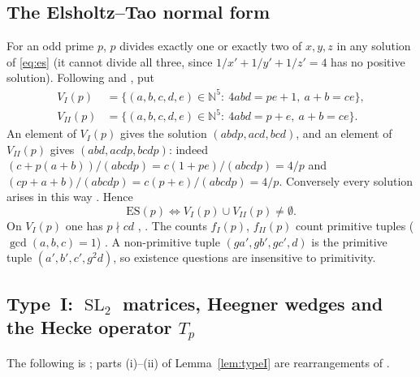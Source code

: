 \documentclass[10pt,reqno]{amsart}
\theoremstyle{definition}
\numberwithin{equation}{section}
\newcommand{\N}{\mathbb N}
\DeclareMathOperator{\SL}{SL}
\begin{document}
\subsection{The Elsholtz--Tao normal form}
For an odd prime $p$, $p$ divides exactly one or exactly two of $x,y,z$ in
any solution of \eqref{eq:es} (it cannot divide all three, since
$1/x'+1/y'+1/z'=4$ has no positive solution). Following \cite[\S2]{ET}
and \cite[\S2.0]{RT2}, put
\begin{align*}
V_I(p)&=\{(a,b,c,d,e)\in\N^5:\ 4abd=pe+1,\ a+b=ce\},\\
V_{II}(p)&=\{(a,b,c,d,e)\in\N^5:\ 4abd=p+e,\ a+b=ce\}.
\end{align*}
An element of $V_I(p)$ gives the solution $(abdp,acd,bcd)$, and an element
of $V_{II}(p)$ gives $(abd,acdp,bcdp)$: indeed
$(c+p(a+b))/(abcdp)=c(1+pe)/(abcdp)=4/p$ and
$(cp+a+b)/(abcdp)=c(p+e)/(abcdp)=4/p$. Conversely every solution arises
in this way \cite[Props.~2.2, 2.6]{ET}. Hence
\begin{equation}\label{eq:VIVII}
\mathrm{ES}(p)\iff V_I(p)\cup V_{II}(p)\neq\emptyset.
\end{equation}
On $V_I(p)$ one has $p\nmid cd$ \cite[Prop.~2.1]{O130}, \cite[\S5]{O131}.
The counts $f_I(p)$, $f_{II}(p)$ count primitive tuples ($\gcd(a,b,c)=1$)
\cite[(2.10)]{ET}. A non-primitive tuple $(ga',gb',gc',d)$ is the primitive
tuple $(a',b',c',g^2d)$, so existence questions are insensitive to
primitivity.

\subsection{Type~I: $\SL_2$ matrices, Heegner wedges and the Hecke operator $T_p$}
The following is \cite[Lemmas~2.1--2.2, 2.4]{O123}; parts (i)--(ii) of
Lemma~\ref{lem:typeI} are rearrangements of \cite[\S2]{ET}.
\end{document}
